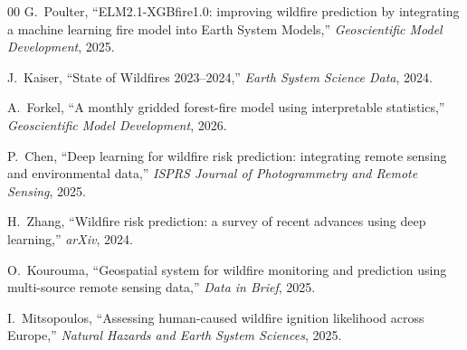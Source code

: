 \documentclass[conference]{IEEEtran}
\begin{document}
\begin{thebibliography}{00}
G.~Poulter, ``ELM2.1-XGBfire1.0: improving wildfire prediction by integrating a
machine learning fire model into Earth System Models,''
\textit{Geoscientific Model Development}, 2025.

J.~Kaiser, ``State of Wildfires 2023--2024,''
\textit{Earth System Science Data}, 2024.

A.~Forkel, ``A monthly gridded forest-fire model using interpretable statistics,''
\textit{Geoscientific Model Development}, 2026.

P.~Chen, ``Deep learning for wildfire risk prediction: integrating remote sensing
and environmental data,'' \textit{ISPRS Journal of Photogrammetry and Remote
Sensing}, 2025.

H.~Zhang, ``Wildfire risk prediction: a survey of recent advances using deep
learning,'' \textit{arXiv}, 2024.

O.~Kourouma, ``Geospatial system for wildfire monitoring and prediction using
multi-source remote sensing data,'' \textit{Data in Brief}, 2025.

I.~Mitsopoulos, ``Assessing human-caused wildfire ignition likelihood across
Europe,'' \textit{Natural Hazards and Earth System Sciences}, 2025.

\end{thebibliography}
\end{document}
